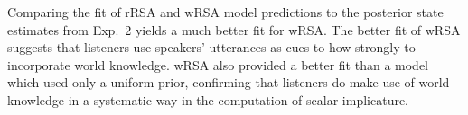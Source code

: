 \documentclass[11pt]{article}
\begin{document}
Comparing the fit of rRSA and wRSA model predictions to the posterior state estimates from Exp.~2 yields a much better fit for wRSA. The better fit of wRSA suggests that listeners  use speakers' utterances as cues to how strongly to incorporate world knowledge. wRSA also provided a better fit than a model which used only a uniform prior, confirming that listeners do make use of world knowledge in a systematic way in the computation of scalar implicature.






\end{document}
